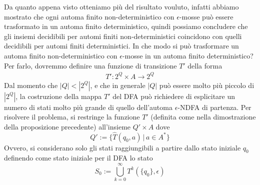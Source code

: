 Da quanto appena visto
otteniamo più del risultato vouluto, 
infatti abbiamo mostrato che ogni automa 
finito non-deterministico con $\epsilon$-mosse 
può essere trasformato in un automa finito deterministico, 
quindi possiamo concludere che gli insiemi decidibili per 
automi finiti non-deterministici coincidono con quelli 
decidibili per automi finiti deterministici.
In che modo si può trasformare un automa finito 
non-deterministico con $\epsilon$-mosse in un automa 
finito deterministico?
\\
Per farlo, dovremmo definire una funzione di transizione $T'$ 
della forma
\[
\begin{matrix}
    T': 2^Q \times A  \to  2^Q 
\end{matrix}
\]
Dal momento che $|Q|<|2^Q|$, e che in generale $|Q|$ può essere molto più piccolo di $|2^Q|$,
la costruzione della mappa $T'$ del DFA può 
richiedere di esplicitare un numero di stati molto più grande 
di quello dell'automa $\epsilon$-NDFA di partenza.
Per risolvere il problema, si restringe la funzione $T'$ 
(definita come nella dimostrazione della proposizione precedente)
all'insieme $Q' \times A$ dove
\[
Q':=
\{
    \widehat T(q_0,a) \, | \, a \in A^*
\}
\]
Ovvero, 
si considerano solo gli stati raggiungibili a partire dallo stato iniziale 
$q_0$
definendo come stato iniziale per il DFA lo stato
\[
S_0:=
\bigcup_{k =0}^\infty T^k(\{ q_0\},\epsilon)
\]
